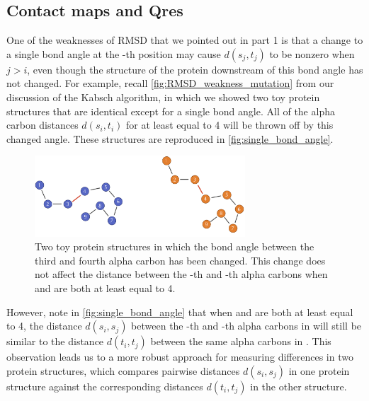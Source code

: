 \FloatBarrier
{}
\subsection{Contact maps and Qres}

One of the weaknesses of RMSD that we pointed out in part 1 is that a change to a single bond angle at the -th position may cause $d(s_{j}, t_{j})$ to be nonzero when $j > i$, even though the structure of the protein downstream of this bond angle has not changed. For example, recall \autoref{fig:RMSD_weakness_mutation} from our discussion of the Kabsch algorithm, in which we showed two toy protein structures that are identical except for a single bond angle. All of the alpha carbon distances $d(s_{i}, t_{i})$ for  at least equal to 4 will be thrown off by this changed angle. These structures are reproduced in \autoref{fig:single_bond_angle}.\\

\begin{figure}[h]
	\centering
	\mySfFamily
	\includegraphics[width = 0.7\textwidth]{../images/single_bond_angle.png}
	\caption{Two toy protein structures in which the bond angle between the third and fourth alpha carbon has been changed. This change does not affect the distance between the -th and -th alpha carbons when  and  are both at least equal to 4.}
	\label{fig:single_bond_angle}
\end{figure}

However, note in \autoref{fig:single_bond_angle} that when  and  are both at least equal to 4, the distance $d(s_{i}, s_{j})$ between the -th and -th alpha carbons in  will still be similar to the distance $d(t_{i}, t_{j})$ between the same alpha carbons in . This observation leads us to a more robust approach for measuring differences in two protein structures, which compares  pairwise distances $d(s_{i}, s_{j})$ in one protein structure against the corresponding distances $d(t_{i}, t_{j})$ in the other structure.

